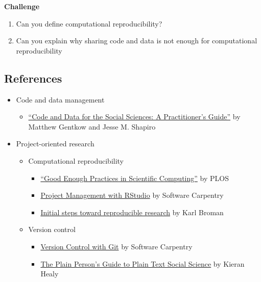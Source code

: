 \documentclass[
]{book}
\providecommand{\tightlist}{%
  \setlength{\itemsep}{0pt}\setlength{\parskip}{0pt}}
\begin{document}
\textbf{Challenge}

\begin{enumerate}
\def\labelenumi{\arabic{enumi}.}
\tightlist
\item
  Can you define computational reproducibility?
\item
  Can you explain why sharing code and data is not enough for computational reproducibility
\end{enumerate}

\subsection{References}\label{references-1}

\begin{itemize}
\item
  Code and data management

  \begin{itemize}
  \tightlist
  \item
    \href{https://web.stanford.edu/~gentzkow/research/CodeAndData.pdf}{``Code and Data for the Social Sciences: A Practitioner's Guide''} by Matthew Gentkow and Jesse M. Shapiro
  \end{itemize}
\item
  Project-oriented research

  \begin{itemize}
  \item
    Computational reproducibility

    \begin{itemize}
    \item
      \href{https://GitHub.com/swcarpentry/good-enough-practices-in-scientific-computing/blob/gh-pages/good-enough-practices-for-scientific-computing.pdf}{``Good Enough Practices in Scientific Computing''} by PLOS
    \item
      \href{https://swcarpentry.GitHub.io/r-novice-gapminder/02-project-intro/}{Project Management with RStudio} by Software Carpentry
    \item
      \href{https://kbroman.org/steps2rr/}{Initial steps toward reproducible research} by Karl Broman
    \end{itemize}
  \item
    Version control

    \begin{itemize}
    \item
      \href{https://swcarpentry.GitHub.io/git-novice/}{Version Control with Git} by Software Carpentry
    \item
      \href{http://plain-text.co/}{The Plain Person's Guide to Plain Text Social Science} by Kieran Healy
    \end{itemize}
  \end{itemize}
\end{itemize}
\end{document}
